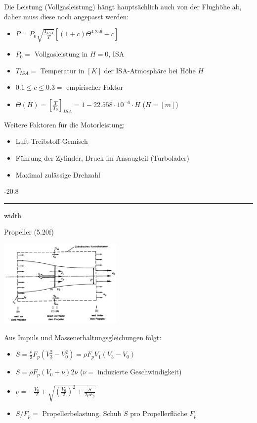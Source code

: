 \documentclass[8pt, landscape, fleqn]{scrartcl}
\makeatletter
\renewcommand{\subsubsection}{\@startsection{subsubsection}{1}{0mm}%
{-2\baselineskip}{0.8\baselineskip}%
{\hrule depth 0.2pt width\columnwidth\vspace*{1.2em}\normalsize\bfseries\rmfamily}}
\makeatother
\begin{document}
\begin{multicols*}{3}
Die Leistung (Vollgasleistung) hängt hauptsächlich auch von der Flughöhe ab, daher muss diese noch angepasst werden:

\begin{itemize}
    \item $P = P_0 \sqrt{\frac{T_{ISA}}{T}} [(1+c)\Theta^{4.256}-c]$
    \item $P_0 = $ Vollgasleistung in $H = 0$, ISA
    \item $T_{ISA}=$ Temperatur in $[K]$ der ISA-Atmosphäre bei Höhe $H$ 
    \item $0.1 \leq c \leq 0.3 = $ empirischer Faktor
    \item $\Theta(H) = \left[\frac{T}{T_0}\right]_{ISA} = 1-22.558\cdot 10^{-6}\cdot H$ ($H = [m]$)
\end{itemize}

Weitere Faktoren für die Motorleistung:

\begin{itemize}
    \item Luft-Treibstoff-Gemisch 
    \item Führung der Zylinder, Druck im Ansaugteil (Turbolader)
    \item Maximal zulässige Drehzahl
\end{itemize}

\subsubsection{Propeller (5.20f)}

\begin{center}
    \includegraphics[width=6cm]{images/Propeller_Ideal.png}
\end{center}

Aus Impuls und Massenerhaltungsgleichungen folgt:

\begin{itemize}
    \item $S = \frac{\rho}{2} F_p (V_3^2 - V_0^2) = \rho F_p V_1 (V_3-V_0)$
    \item $S = \rho F_p (V_0 + \nu) 2\nu$ ($\nu = $ induzierte Geschwindigkeit)
    \item $\nu = -\frac{V_0}{2} + \sqrt{\left( \frac{V_0}{2}\right)^2 + \frac{S}{2\rho F_p}}$
    \item $S/F_p = $ Propellerbelastung, Schub $S$ pro Propellerfläche $F_p$
\end{itemize}


\end{multicols*}
\end{document}
